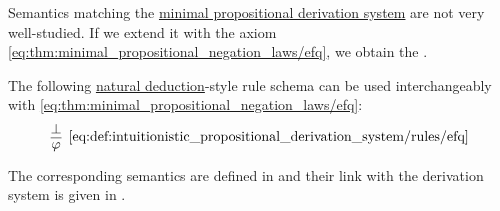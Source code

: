\begin{definition}\label{def:intuitionistic_propositional_derivation_system}
  Semantics matching the \hyperref[def:minimal_propositional_derivation_system]{minimal propositional derivation system} are not very well-studied. If we extend it with the axiom \eqref{eq:thm:minimal_propositional_negation_laws/efq}, we obtain the .

   The following \hyperref[thm:minimal_natural_deduction]{natural deduction}-style rule schema can be used interchangeably with \eqref{eq:thm:minimal_propositional_negation_laws/efq}:
  \begin{equation*}\taglabel[\textrm{R} \textrm{EFQ}]{eq:def:intuitionistic_propositional_derivation_system/rules/efq}
    \begin{prooftree}
      \hypo{ \bot }
      \infer1[\ref{eq:def:intuitionistic_propositional_derivation_system/rules/efq}]{ \varphi }
    \end{prooftree}
  \end{equation*}

  The corresponding semantics are defined in  and their link with the derivation system is given in .
\end{definition}

